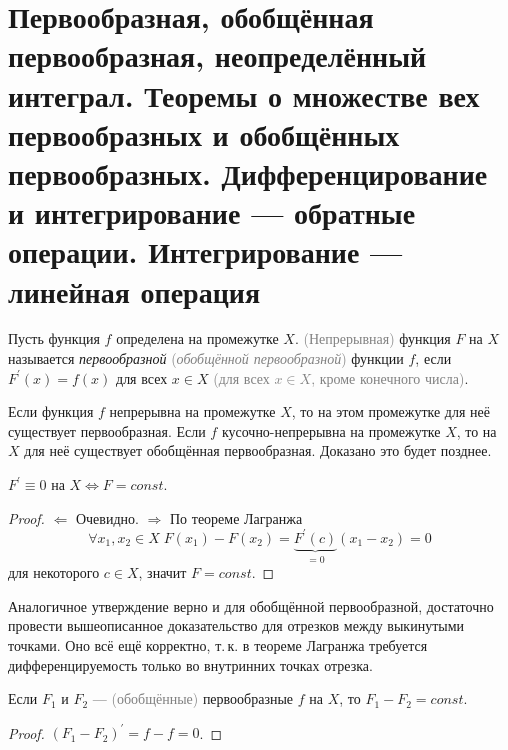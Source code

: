 \section{Первообразная, обобщённая первообразная, неопределённый интеграл. Теоремы о множестве вех первообразных и обобщённых первообразных. Дифференцирование и интегрирование --- обратные операции. Интегрирование --- линейная операция}

\begin{definition}
    Пусть функция $f$ определена на промежутке $X$. \textcolor{gray}{(Непрерывная)} функция $F$ на $X$ называется \textit{первообразной} \textcolor{gray}{(\textit{обобщённой первообразной})} функции $f$, если $F^\prime(x) = f(x)$ для всех $x \in X$ \textcolor{gray}{(для всех $x \in X$, кроме конечного числа)}.
\end{definition}

\begin{remark}
    Если функция $f$ непрерывна на промежутке $X$, то на этом промежутке для неё существует первообразная. Если $f$ кусочно-непрерывна на промежутке $X$, то на $X$ для неё существует обобщённая первообразная. Доказано это будет позднее.
\end{remark}

\begin{statement}
    $F^\prime \equiv 0$ на $X \iff F = const$.
\end{statement}

\begin{proof}
    $\Leftarrow$ Очевидно. $\Rightarrow$ По теореме Лагранжа \[\forall x_1, x_2 \in X\;F(x_1) - F(x_2) = \underbrace{F^\prime(c)}_{{} = 0}(x_1 - x_2) = 0\] для некоторого $c \in X$, значит $F = const$.
\end{proof}

Аналогичное утверждение верно и для обобщённой первообразной, достаточно провести вышеописанное доказательство для отрезков между выкинутыми точками. Оно всё ещё корректно, т.\,к. в теореме Лагранжа требуется дифференцируемость только во внутринних точках отрезка.

\begin{theorem}
    Если $F_1$ и $F_2$ --- \textcolor{gray}{(обобщённые)} первообразные $f$ на $X$, то $F_1 - F_2 = const$.
\end{theorem}

\begin{proof}
    $(F_1 - F_2)^\prime = f - f = 0$.
\end{proof}

